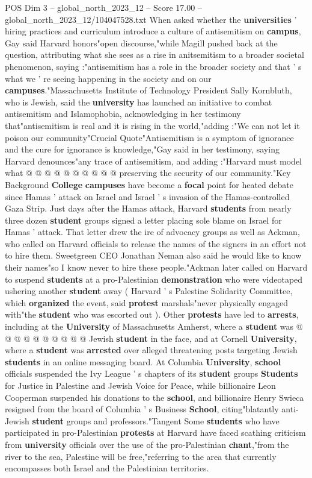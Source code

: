 \begin{textsample}{POS Dim 3 – global\_north\_2023\_12 – Score 17.00 – global\_north\_2023\_12/104047528.txt}
When asked whether the \textbf{universities} ' hiring practices and curriculum introduce a culture of antisemitism on \textbf{campus}, Gay said Harvard honors"open discourse,"while Magill pushed back at the question, attributing what she sees as a rise in anitsemitism to a broader societal phenomenon, saying :"antisemitism has a role in the broader society and that ' s what we ' re seeing happening in the society and on our \textbf{campuses}."Massachusetts Institute of Technology President Sally Kornbluth, who is Jewish, said the \textbf{university} has launched an initiative to combat antisemitism and Islamophobia, acknowledging in her testimony that"antisemitism is real and it is rising in the world,"adding :"We can not let it poison our community"Crucial Quote"Antisemitism is a symptom of ignorance and the cure for ignorance is knowledge,"Gay said in her testimony, saying Harvard denounces"any trace of antisemitism, and adding :"Harvard must model what @ @ @ @ @ @ @ @ @ @ preserving the security of our community."Key Background \textbf{College} \textbf{campuses} have become a \textbf{focal} point for heated debate since Hamas ' attack on Israel and Israel ' s invasion of the Hamas-controlled Gaza Strip.
Just days after the Hamas attack, Harvard \textbf{students} from nearly three dozen \textbf{student} groups signed a letter placing sole blame on Israel for Hamas ' attack.
That letter drew the ire of advocacy groups as well as Ackman, who called on Harvard officials to release the names of the signers in an effort not to hire them.
Sweetgreen CEO Jonathan Neman also said he would like to know their names"so I know never to hire these people."Ackman later called on Harvard to suspend \textbf{students} at a pro-Palestinian \textbf{demonstration} who were videotaped ushering another \textbf{student} away ( Harvard ' s Palestine Solidarity Committee, which \textbf{organized} the event, said \textbf{protest} marshals"never physically engaged with"the \textbf{student} who was escorted out ).
Other \textbf{protests} have led to \textbf{arrests}, including at the \textbf{University} of Massachusetts Amherst, where a \textbf{student} was @ @ @ @ @ @ @ @ @ @ Jewish \textbf{student} in the face, and at Cornell \textbf{University}, where a \textbf{student} was \textbf{arrested} over alleged threatening posts targeting Jewish \textbf{students} in an online messaging board.
At Columbia \textbf{University}, \textbf{school} officials suspended the Ivy League ' s chapters of its \textbf{student} groups \textbf{Students} for Justice in Palestine and Jewish Voice for Peace, while billionaire Leon Cooperman suspended his donations to the \textbf{school}, and billionaire Henry Swieca resigned from the board of Columbia ' s Business \textbf{School}, citing"blatantly anti-Jewish \textbf{student} groups and professors."Tangent Some \textbf{students} who have participated in pro-Palestinian \textbf{protests} at Harvard have faced scathing criticism from \textbf{university} officials over the use of the pro-Palestinian \textbf{chant},"from the river to the sea, Palestine will be free,"referring to the area that currently encompasses both Israel and the Palestinian territories.

\end{textsample}
